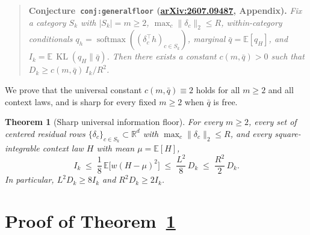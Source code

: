 \documentclass[11pt]{article}
\theoremstyle{plain}
\newtheorem{theorem}{Theorem}
\theoremstyle{definition}
\theoremstyle{remark}
\DeclareMathOperator{\KL}{KL}
\DeclareMathOperator{\softmax}{softmax}
\begin{document}
\begin{quote}
\textbf{Conjecture~\texttt{conj:generalfloor} (\href{https://arxiv.org/abs/2607.09487}{arXiv:2607.09487}, Appendix).}
\emph{Fix a category $S_k$ with $|S_k| = m \ge 2$, $\max_c \|\delta_c\|_2 \le R$, within-category conditionals $q_h = \softmax((\delta_c^\top h)_{c \in S_k})$, marginal $\bar{q} = \mathbb{E}[q_H]$, and $I_k = \mathbb{E}\,\KL(q_H \| \bar{q})$. Then there exists a constant $c(m, \bar{q}) > 0$ such that $D_k \ge c(m, \bar{q})\, I_k / R^2$.}
\end{quote}

We prove that the universal constant $c(m, \bar{q}) \equiv 2$ holds for all $m \ge 2$ and all context laws, and is sharp for every fixed $m \ge 2$ when $\bar{q}$ is free.

\begin{theorem}[Sharp universal information floor]\label{thm:floor}
For every $m \ge 2$, every set of centered residual rows $\{\delta_c\}_{c \in S_k} \subset \mathbb{R}^d$ with $\max_c \|\delta_c\|_2 \le R$, and every square-integrable context law $H$ with mean $\mu = \mathbb{E}[H]$,
\begin{equation}\label{eq:chain}
I_k \;\le\; \frac{1}{8}\,\mathbb{E}\bigl[w(H - \mu)^2\bigr]
\;\le\; \frac{L^2}{8}\,D_k
\;\le\; \frac{R^2}{2}\,D_k.
\end{equation}
In particular, $L^2 D_k \ge 8 I_k$ and $R^2 D_k \ge 2 I_k$.
\end{theorem}

\section{Proof of Theorem~\ref{thm:floor}}
\end{document}
